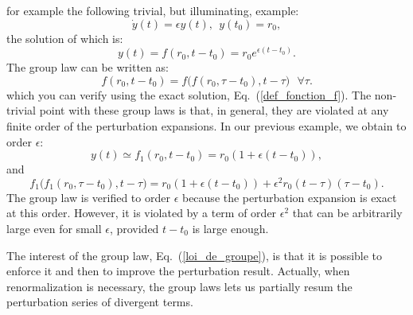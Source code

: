 \documentclass[floatfix,preprintnumbers,amsmath,amssymb,prb,12pt]{revtex4-1}
\begin{document}
for example the following trivial, but illuminating, example:
\begin{equation}
\dot{y}(t)=\epsilon y(t),\ \ y(t_0)=r_0,
\label{trivial_equa_diff}
\end{equation}
the solution of which is:
\begin{equation}
y(t)=f(r_0,t-t_0)=r_0 e^{\epsilon(t-t_0)}.
\label{def_fonction_f}
\end{equation}
The group law can be written as\cite{foot9}:
\begin{equation}
f(r_0,t-t_0)= f\big(f(r_0,\tau-t_0),t-\tau\big)\ \ \ \forall \tau.
\label{loi_de_groupe}
\end{equation}
which you can verify using the exact solution,
Eq.~(\ref{def_fonction_f}). The non-trivial point with these group
laws is that, in general, they are violated at any finite order of
the perturbation expansions. In our previous example, we obtain to
order $\epsilon$:
\begin{equation}
y(t)\simeq f_1(r_0,t-t_0)=r_0 (1+\epsilon(t-t_0)),
\label{equa_diff_premier_ordre}
\end{equation}
and 
\begin{equation}
f_1\big(f_1(r_0,\tau-t_0),t-\tau\big)=
r_0 (1+\epsilon(t-t_0))+\epsilon^2 r_0
(t-\tau)(\tau-t_0).
\label{loi_groupe_approchee}
\end{equation}
The group law is verified to order $\epsilon$ because the
perturbation expansion is exact at this order. However, it is
violated by a term of order $\epsilon^2$ that can be arbitrarily
large even for small $\epsilon$, provided $t-t_0$ is large enough.

The interest of the group law, Eq.~(\ref{loi_de_groupe}), is that
it is possible to enforce it and then to improve the perturbation
result. Actually, when renormalization is necessary, the group
laws lets us partially resum the perturbation series of divergent
terms.
\end{document}
